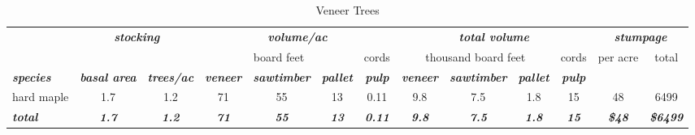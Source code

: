 \documentclass[landscape]{article}
\begin{document}
\begin{table}[H]

\caption{\label{tab:unnamed-chunk-60}Veneer Trees}
\fontsize{10}{12}\selectfont
\begin{tabular}[t]{lcccccccccccc}
\toprule
\multicolumn{1}{c}{\em{\textbf{ }}} & \multicolumn{2}{c}{\em{\textbf{stocking}}} & \multicolumn{4}{c}{\em{\textbf{volume/ac }}} & \multicolumn{4}{c}{\em{\textbf{total volume}}} & \multicolumn{2}{c}{\em{\textbf{stumpage}}} \\
\cmidrule(l{3pt}r{3pt}){2-3} \cmidrule(l{3pt}r{3pt}){4-7} \cmidrule(l{3pt}r{3pt}){8-11} \cmidrule(l{3pt}r{3pt}){12-13}
\multicolumn{3}{c}{ } & \multicolumn{3}{c}{board feet} & \multicolumn{1}{c}{cords} & \multicolumn{3}{c}{thousand board feet} & \multicolumn{1}{c}{cords} & \multicolumn{1}{c}{per acre} & \multicolumn{1}{c}{total} \\
\cmidrule(l{3pt}r{3pt}){4-6} \cmidrule(l{3pt}r{3pt}){7-7} \cmidrule(l{3pt}r{3pt}){8-10} \cmidrule(l{3pt}r{3pt}){11-11} \cmidrule(l{3pt}r{3pt}){12-12} \cmidrule(l{3pt}r{3pt}){13-13}
\rowcolor[HTML]{DCDCDC}  \em{\textbf{species}} & \em{\textbf{basal area}} & \em{\textbf{trees/ac}} & \em{\textbf{veneer}} & \em{\textbf{sawtimber}} & \em{\textbf{pallet}} & \em{\textbf{pulp}} & \em{\textbf{veneer}} & \em{\textbf{sawtimber}} & \em{\textbf{pallet}} & \em{\textbf{pulp}} & \em{\textbf{ }} & \em{\textbf{ }}\\
\midrule
\rowcolor{gray!6}  hard maple & 1.7 & 1.2 & 71 & 55 & 13 & 0.11 & 9.8 & 7.5 & 1.8 & 15 & 48 & 6499\\
 
\rowcolor[HTML]{DCDCDC}  \em{\textbf{total}} & \em{\textbf{1.7}} & \em{\textbf{1.2}} & \em{\textbf{71}} & \em{\textbf{55}} & \em{\textbf{13}} & \em{\textbf{0.11}} & \em{\textbf{9.8}} & \em{\textbf{7.5}} & \em{\textbf{1.8}} & \em{\textbf{15}} & \em{\textbf{\$48}} & \em{\textbf{\$6499}}\\
\bottomrule
\end{tabular}
\end{table}
\end{document}
